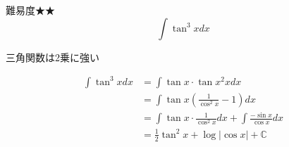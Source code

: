 \documentclass[main]{subfiles}
\begin{document}

\begin{mondai}{難易度★★}{}
    $$\int \tan ^3 x dx$$
    
    \tcblower
    
    \begin{pointbox}
        \begin{center}
        三角関数は2乗に強い
        \end{center}
    \end{pointbox}

    \begin{align*}
        \int \tan ^3 x dx   &= \int \tan x \cdot \tan x ^2 x dx \\
                            &= \int \tan x \left( \frac{1}{\cos ^2 x} -1 \right)  dx \\
                            &= \int \tan x \cdot \frac{1}{\cos ^2 x} dx + \int \frac{-\sin x}{\cos x} dx \\
                            &= \frac{1}{2} \tan ^2 x + \log \left| \cos x \right| + \mathbb{C} \tag{答}
    \end{align*}
\end{mondai}
\end{document}
